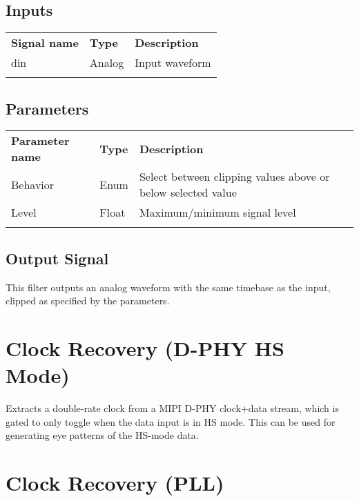 \subsection{Inputs}

\begin{tabularx}{16cm}{llX}
\thickhline
\textbf{Signal name} & \textbf{Type} & \textbf{Description} \\
\thickhline
din & Analog & Input waveform \\
\thickhline
\end{tabularx}

\subsection{Parameters}

\begin{tabularx}{16cm}{llX}
\thickhline
\textbf{Parameter name} & \textbf{Type} & \textbf{Description} \\
\thickhline
Behavior & Enum & Select between clipping values above or below selected value\\
\thinhline
Level & Float & Maximum/minimum signal level\\
\thickhline
\end{tabularx}

\subsection{Output Signal}

This filter outputs an analog waveform with the same timebase as the input, clipped as specified by the parameters.

\pagebreak
\section{Clock Recovery (D-PHY HS Mode)}

Extracts a double-rate clock from a MIPI D-PHY clock+data stream, which is gated to only toggle when the data input
is in HS mode. This can be used for generating eye patterns of the HS-mode data.

\pagebreak
\section{Clock Recovery (PLL)}
\label{filter:cdrpll}

